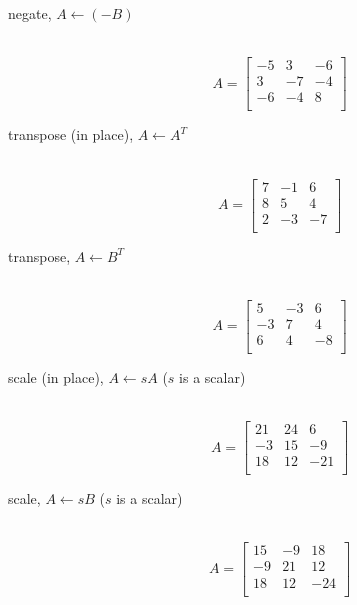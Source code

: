\begin{description}
  \item[negate, $A\leftarrow (-B)$]\ \newline
    \begin{equation}\nonumber
    A = \left[
    \begin{array}{rrr}
    -5 &  3  & -6 \\
     3 & -7  & -4 \\
    -6 & -4  &  8 \\
    \end{array}\right]
    \end{equation}

  \item[transpose (in place), $A\leftarrow A^T$]\ \newline
    \begin{equation}\nonumber
    A = \left[
    \begin{array}{rrr}
     7 & -1  &  6 \\
     8 &  5  &  4 \\
     2 & -3  & -7 \\
    \end{array}\right]
    \end{equation}

  \item[transpose, $A\leftarrow B^T$]\ \newline
    \begin{equation}\nonumber
    A = \left[
    \begin{array}{rrr}
     5 & -3  &  6 \\
    -3 &  7  &  4 \\
     6 &  4  & -8 \\
    \end{array}\right]
    \end{equation}

  \item[scale (in place), $A\leftarrow sA$ ($s$ is a scalar)]\ \newline
    \begin{equation}\nonumber
    A = \left[
    \begin{array}{rrr}
     21 &  24 &  6  \\
    -3  &  15 & -9  \\
     18 &  12 & -21 \\
    \end{array}\right]
    \end{equation}

  \item[scale, $A\leftarrow sB$ ($s$ is a scalar)]\ \newline
    \begin{equation}\nonumber
    A = \left[
    \begin{array}{rrr}
     15 &  -9 &  18 \\
    -9  &  21 &  12 \\
     18 &  12 & -24 \\
    \end{array}\right]
    \end{equation}


\end{description}
